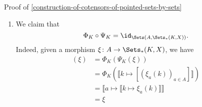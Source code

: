 \begin{Proof}{Proof of \cref{construction-of-cotensors-of-pointed-sets-by-sets}}
\begin{enumerate}
\begin{enumerate}
                    \begin{align*}
                        [\Psi_{K}\circ\Phi_{K}](\xi) &= \llbracket k\mapsto[(\xi_{a}(k))_{a\in A}]\rrbracket\\%
                                                     &= \llbracket k\mapsto[(x_{0})_{a\in A}]\rrbracket\\%
                                                     &= \llbracket k\mapsto\xi(k)\rrbracket\\%
                                                     &= \xi.%
                    \end{align*}
                \item\label{proof-of-construction-of-cotensors-of-pointed-sets-by-sets-3b}If $\xi(k)\neq [(x_{0})_{a\in A}]$ and $\xi(k)=[(x^{k}_{a})_{a\in A}]$ instead, we have
                    \begin{align*}
                        [\Psi_{K}\circ\Phi_{K}](\xi) &= \llbracket k\mapsto[(\xi_{a}(k))_{a\in A}]\rrbracket\\%
                                                     &= \llbracket k\mapsto[(x^{k}_{a})_{a\in A}]\rrbracket\\%
                                                     &= \llbracket k\mapsto\xi(k)\rrbracket\\%
                                                     &= \xi.%
                    \end{align*}
            \end{enumerate}
            In both cases, we have $[\Psi_{K}\circ\Phi_{K}](\xi)=\xi$, and thus we are done.
        \item\label{proof-of-construction-of-cotensors-of-pointed-sets-by-sets-4}We claim that
            \[
                \Phi_{K}\circ\Psi_{K}%
                =%
                \id_{\Sets(A,\Sets_{*}(K,X))}.%
            \]%
            Indeed, given a morphism $\xi\colon A\to\Sets_{*}(K,X)$, we have
            \begin{align*}
                [\Phi_{K}\circ\Psi_{K}](\xi) &= \Phi_{K}(\Psi_{K}(\xi))\\%
                                             &= \Phi_{K}(\llbracket k\mapsto[(\xi_{a}(k))_{a\in A}]\rrbracket)\\%
                                             &= \llbracket a\mapsto\llbracket k\mapsto\xi_{a}(k)\rrbracket\rrbracket\\%
                                             &= \xi%

\end{align*}
\end{enumerate}
\end{Proof}
